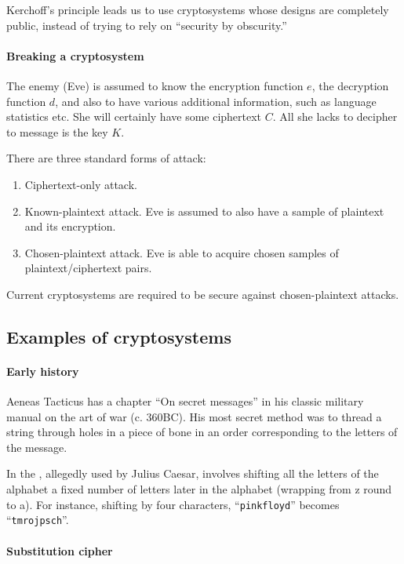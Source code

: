 \documentclass[a4paper, 11pt, openany]{book}
\begin{document}
Kerchoff's principle leads us to use cryptosystems whose designs are completely public, instead of trying to rely on ``security by obscurity.''


\paragraph{Breaking a cryptosystem}
The enemy (Eve) is assumed to know the encryption function $e$, the decryption function $d$, and also to have various additional information, such as language statistics etc.
She will certainly have some ciphertext $C$.
All she lacks to decipher to message is the key $K$.

There are three standard forms of attack:
\begin{enumerate}
    \item Ciphertext-only attack.

    \item Known-plaintext attack.
Eve is assumed to also have a sample of plaintext and its encryption.

    \item Chosen-plaintext attack.
Eve is able to acquire chosen samples of plaintext/ciphertext pairs.
\end{enumerate}
Current cryptosystems are required to be secure against chosen-plaintext attacks.




\subsection{Examples of cryptosystems}

\paragraph{Early history}
Aeneas Tacticus has a chapter ``On secret messages'' in his classic military manual on the art of war (c. 360BC).
His most secret method was to thread a string through holes in a piece of bone in an order corresponding to the letters of the message.


In the , allegedly used by Julius Caesar, involves shifting all the letters of the alphabet a fixed number of letters later in the alphabet (wrapping from z round to a). For instance, shifting by four characters, ``\texttt{pinkfloyd}'' becomes ``\texttt{tmrojpsch}''.


\paragraph{Substitution cipher}
\end{document}
